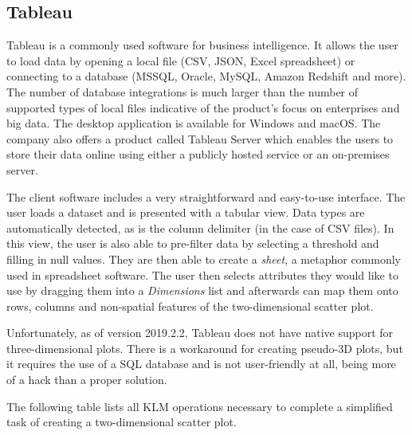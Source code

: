 \documentclass[thesis=M,english,hidelinks]{FITthesisXE}[2012/06/26]
\begin{document}
\subsection{Tableau}

Tableau is a commonly used software for business intelligence. It allows the user to load data by opening a local file (CSV, JSON, Excel spreadsheet) or connecting to a database (MSSQL, Oracle, MySQL, Amazon Redshift and more). The number of database integrations is much larger than the number of supported types of local files indicative of the product's focus on enterprises and big data. The desktop application is available for Windows and macOS.\autocite{tableau} The company also offers a product called Tableau Server which enables the users to store their data online using either a publicly hosted service or an on-premises server.

The client software includes a very straightforward and easy-to-use interface. The user loads a dataset and is presented with a tabular view. Data types are automatically detected, as is the column delimiter (in the case of CSV files). In this view, the user is also able to pre-filter data by selecting a threshold and filling in null values. They are then able to create a \emph{sheet}, a metaphor commonly used in spreadsheet software. The user then selects attributes they would like to use by dragging them into a \emph{Dimensions} list and afterwards can map them onto rows, columns and non-spatial features of the two-dimensional scatter plot.

Unfortunately, as of version 2019.2.2, Tableau does not have native support for three-dimensional plots. There is a workaround for creating pseudo-3D plots, but it requires the use of a SQL database and is not user-friendly at all, being more of a hack than a proper solution.\autocite{tableau3d}

The following table lists all KLM operations necessary to complete a simplified task of creating a two-dimensional scatter plot.
\end{document}
